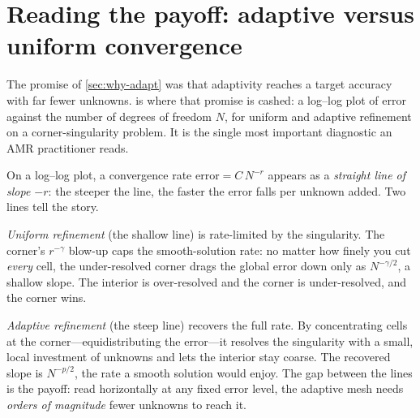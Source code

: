 \section{Reading the payoff: adaptive versus uniform convergence}
\label{sec:convergence}

The promise of \cref{sec:why-adapt} was that adaptivity reaches a target accuracy with
far fewer unknowns.  is where that promise is cashed: a
log--log plot of error against the number of degrees of freedom $N$, for uniform and
adaptive refinement on a corner-singularity problem. It is the single most important
diagnostic an AMR practitioner reads.

On a log--log plot, a convergence rate $\text{error} = C\,N^{-r}$ appears as a
\emph{straight line of slope $-r$}: the steeper the line, the faster the error falls
per unknown added. Two lines tell the story.

\emph{Uniform refinement} (the shallow line) is rate-limited by the singularity. The
corner's $r^{-\gamma}$ blow-up caps the smooth-solution rate: no matter how finely you
cut \emph{every} cell, the under-resolved corner drags the global error down only as
$N^{-\gamma/2}$, a shallow slope. The interior is over-resolved and the corner is
under-resolved, and the corner wins.

\emph{Adaptive refinement} (the steep line) recovers the full rate. By concentrating
cells at the corner---equidistributing the error---it resolves the singularity with a
small, local investment of unknowns and lets the interior stay coarse. The recovered
slope is $N^{-p/2}$, the rate a smooth solution would enjoy. The gap between the lines
is the payoff: read horizontally at any fixed error level, the adaptive mesh needs
\emph{orders of magnitude} fewer unknowns to reach it.

